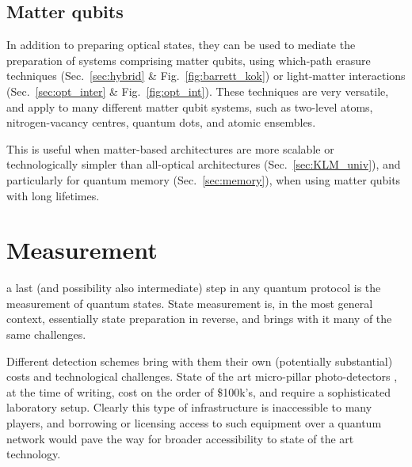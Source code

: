 
%
%

\subsection{Matter qubits} 

In addition to preparing optical states, they can be used to mediate the preparation of systems comprising matter qubits, using which-path erasure techniques (Sec.~\ref{sec:hybrid} \& Fig.~\ref{fig:barrett_kok}) or light-matter interactions (Sec.~\ref{sec:opt_inter} \& Fig.~\ref{fig:opt_int}). These techniques are very versatile, and apply to many different matter qubit systems, such as two-level atoms, nitrogen-vacancy centres, quantum dots, and atomic ensembles.

This is useful when matter-based architectures are more scalable or technologically simpler than all-optical architectures (Sec.~\ref{sec:KLM_univ}), and particularly for quantum memory (Sec.~\ref{sec:memory}), when using matter qubits with long lifetimes.

%
%

\section{Measurement} 

 a last (and possibility also intermediate) step in any quantum protocol is the measurement of quantum states. State measurement is, in the most general context, essentially state preparation in reverse, and brings with it many of the same challenges.

Different detection schemes bring with them their own (potentially substantial) costs and technological challenges. State of the art micro-pillar photo-detectors \cite{???}, at the time of writing, cost on the order of \$100k's, and require a sophisticated laboratory setup. Clearly this type of infrastructure is inaccessible to many players, and borrowing or licensing access to such equipment over a quantum network would pave the way for broader accessibility to state of the art technology.

